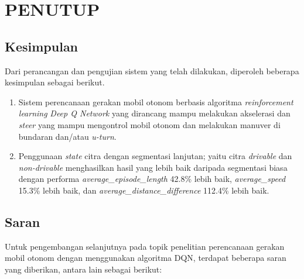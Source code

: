 \chapter{PENUTUP}
\label{chap:penutup}


\section{Kesimpulan}
\label{sec:kesimpulan}

Dari perancangan dan pengujian sistem yang telah dilakukan, diperoleh beberapa kesimpulan sebagai berikut. 

\begin{enumerate}[nolistsep]

  \item Sistem perencanaan gerakan mobil otonom berbasis algoritma \textit{reinforcement learning} \textit{Deep Q Network} yang dirancang mampu melakukan akselerasi dan \textit{steer} yang mampu mengontrol mobil otonom dan melakukan manuver di bundaran dan/atau \textit{u-turn}.

  \item Penggunaan \textit{state } citra dengan segmentasi lanjutan; yaitu citra \textit{drivable }dan \textit{non-drivable} menghasilkan hasil yang lebih baik daripada segmentasi biasa dengan performa \textit{average\_episode\_length} 42.8\% lebih baik, \textit{average\_speed} 15.3\% lebih baik, dan \textit{average\_distance\_difference} 112.4\% lebih baik.

\end{enumerate}

\section{Saran}
\label{chap:saran}

Untuk pengembangan selanjutnya pada topik penelitian perencanaan gerakan mobil otonom dengan menggunakan algoritma DQN, terdapat beberapa saran yang diberikan, antara lain sebagai berikut:

